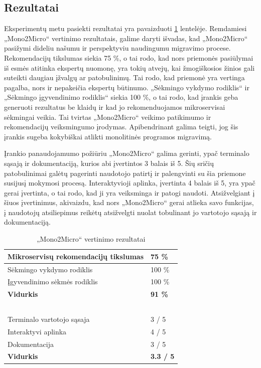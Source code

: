 \documentclass{VUMIFPSbakalaurinis}
\begin{document}
\subsection{Rezultatai}
Eksperimentų metu pasiekti rezultatai yra pavaizduoti \ref{table:rezultatai} lentelėje. Remdamiesi „Mono2Micro“ vertinimo rezultatais, galime daryti išvadas, kad „Mono2Micro“ pasižymi dideliu našumu ir perspektyviu naudingumu migravimo procese. Rekomendacijų tikslumas siekia 75 \%, o tai rodo, kad nors priemonės pasiūlymai iš esmės atitinka ekspertų nuomonę, yra tokių atvejų, kai žmogiškosios žinios gali suteikti daugiau įžvalgų ar patobulinimų. Tai rodo, kad priemonė yra vertinga pagalba, nors ir nepakeičia ekspertų būtinumo. „Sėkmingo vykdymo rodiklis“ ir „Sėkmingo įgyvendinimo rodiklis“ siekia 100 \%, o tai rodo, kad įrankis geba generuoti rezultatus be klaidų ir kad jo rekomenduojamos mikroservisai sėkmingai veikia. Tai tvirtas „Mono2Micro“ veikimo patikimumo ir rekomendacijų veiksmingumo įrodymas. Apibendrinant galima teigti, jog šis įrankis sugeba kokybiškai atlikti monolitinės programos migravimą.

Įrankio panaudojamumo požiūriu „Mono2Micro“ galima gerinti, ypač terminalo sąsają ir dokumentaciją, kurios abi įvertintos 3 balais iš 5. Šių sričių patobulinimai galėtų pagerinti naudotojo patirtį ir palengvinti su šia priemone susijusį mokymosi procesą. Interaktyvioji aplinka, įvertinta 4 balais iš 5, yra ypač gerai įvertinta, o tai rodo, kad ji yra veiksminga ir patogi naudoti. Atsižvelgiant į šiuos įvertinimus, akivaizdu, kad nors „Mono2Micro“ gerai atlieka savo funkcijas, į naudotojų atsiliepimus reikėtų atsižvelgti nuolat tobulinant jo vartotojo sąsają ir dokumentaciją.

\begin{table}[!ht]
    \centering
    \caption{„Mono2Micro“ vertinimo rezultatai}
    \label{table:rezultatai}
    \begin{tabular}{|l|l|}
    \hline
        Mikroservisų rekomendacijų tikslumas & 75 \% \\ \hline
        Sėkmingo vykdymo rodiklis & 100 \% \\ \hline
        Įgyvendinimo sėkmės rodiklis & 100 \% \\ \hline
        \textbf{Vidurkis} & \textbf{91 \%} \\ \hline
        ~ & ~ \\ \hline
        Terminalo vartotojo sąsaja & 3 / 5 \\ \hline
        Interaktyvi aplinka & 4 / 5 \\ \hline
        Dokumentacija & 3 / 5 \\ \hline
        \textbf{Vidurkis} & \textbf{3.3 / 5} \\ \hline
    \end{tabular}
\end{table}
\end{document}

